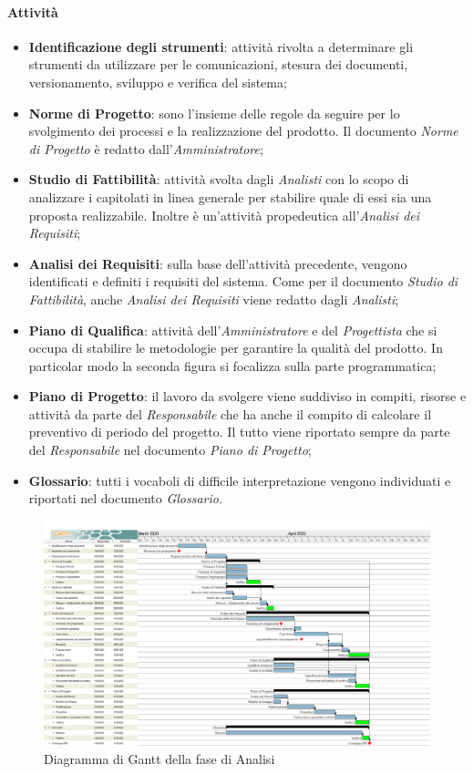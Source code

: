 \paragraph{Attività}
\begin{itemize}
\item \textbf{Identificazione degli strumenti}: attività rivolta a determinare gli strumenti da utilizzare per le comunicazioni, stesura dei documenti, versionamento, sviluppo e verifica del sistema;
\item \textbf{Norme di Progetto}: sono l'insieme delle regole da seguire per lo svolgimento dei processi e la realizzazione del prodotto. Il documento \textit{Norme di Progetto} è redatto dall'\textit{Amministratore};
\item \textbf{Studio di Fattibilità}: attività svolta dagli \textit{Analisti} con lo scopo di analizzare i capitolati in linea generale per stabilire quale di essi sia una proposta realizzabile. Inoltre è un'attività propedeutica all'\textit{Analisi dei Requisiti};
\item \textbf{Analisi dei Requisiti}: sulla base dell'attività precedente, vengono identificati e definiti i requisiti del sistema. Come per il documento \textit{Studio di Fattibilità}, anche \textit{Analisi dei Requisiti} viene redatto dagli \textit{Analisti};
\item \textbf{Piano di Qualifica}: attività dell'\textit{Amministratore} e del \textit{Progettista} che si occupa di stabilire le metodologie per garantire la qualità del prodotto. In particolar modo la seconda figura si focalizza sulla parte programmatica;
\item \textbf{Piano di Progetto}: il lavoro da svolgere viene suddiviso in compiti, risorse e attività da parte del \textit{Responsabile} che ha anche il compito di calcolare il preventivo di periodo del progetto. Il tutto viene riportato sempre da parte del \textit{Responsabile} nel documento \textit{Piano di Progetto};
\item \textbf{Glossario}: tutti i vocaboli di difficile interpretazione vengono individuati e riportati nel documento \textit{Glossario}.
\end{itemize}

\begin{figure}[H]
\centering
\includegraphics[scale=0.24]{./img/gantt/analisi.png}
\caption{Diagramma di Gantt della fase di Analisi}
\end{figure}

